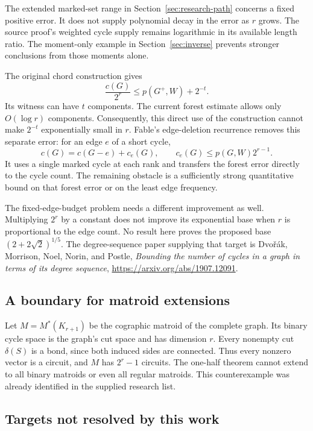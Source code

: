 The extended marked-set range in Section~\ref{sec:research-path} concerns a fixed positive error.
It does not supply polynomial decay in the error as $r$ grows.
The source proof's weighted cycle supply remains logarithmic in its available length ratio.
The moment-only example in Section~\ref{sec:inverse} prevents stronger conclusions from those moments alone.

The original chord construction gives
\[
 \frac{c(G)}{2^r}\le p(G^+,W)+2^{-t}.
\]
Its witness can have $t$ components.
The current forest estimate allows only $O(\log r)$ components.
Consequently, this direct use of the construction cannot make $2^{-t}$ exponentially small in $r$.
Fable's edge-deletion recurrence removes this separate error: for an edge $e$ of a short cycle,
\[
 c(G)=c(G-e)+c_e(G),\qquad c_e(G)\le p(G,W)2^{r-1}.
\]
It uses a single marked cycle at each rank and transfers the forest error directly to the cycle count.
The remaining obstacle is a sufficiently strong quantitative bound on that forest error or on the least edge frequency.

The fixed-edge-budget problem needs a different improvement as well.
Multiplying $2^r$ by a constant does not improve its exponential base when $r$ is proportional to the edge count.
No result here proves the proposed base $(2+2\sqrt2)^{1/5}$.
The degree-sequence paper supplying that target is Dvo\v r\'ak, Morrison, Noel, Norin, and Postle,
\emph{Bounding the number of cycles in a graph in terms of its degree sequence},
\url{https://arxiv.org/abs/1907.12091}.

\subsection{A boundary for matroid extensions}

Let $M=M^*(K_{r+1})$ be the cographic matroid of the complete graph.
Its binary cycle space is the graph's cut space and has dimension $r$.
Every nonempty cut $\delta(S)$ is a bond, since both induced sides are connected.
Thus every nonzero vector is a circuit, and $M$ has $2^r-1$ circuits.
The one-half theorem cannot extend to all binary matroids or even all regular matroids.
This counterexample was already identified in the supplied research list.

\subsection{Targets not resolved by this work}

